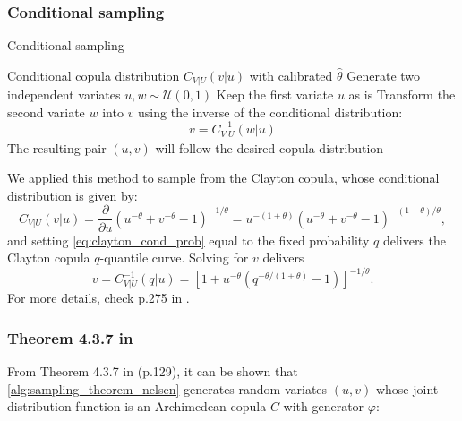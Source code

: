 \subsubsection{Conditional sampling}

\begin{algorithm}[H]
\caption{Conditional sampling}
\begin{algorithmic}[1]
\Require Conditional copula distribution $C_{V|U}(v|u)$ with calibrated $\hat \theta$
\State Generate two independent variates $u,w\sim \mathcal U(0,1)$
\State Keep the first variate $u$ as is
\State Transform the second variate $w$ into $v$ using the inverse of the conditional distribution:
$$v = C^{-1}_{V|U}(w|u)$$
\Ensure The resulting pair $(u,v)$ will follow the desired copula distribution
\end{algorithmic}
\end{algorithm}

We applied this method to sample from the Clayton copula, whose conditional distribution is given by:
\begin{equation}\label{eq:clayton_cond_prob}
	C_{V|U}(v|u)= \frac{\partial}{\partial u} (u^{-\theta}+v^{-\theta} - 1)^{-1/\theta} = u^{-(1+\theta)}(u^{-\theta}+v^{-\theta} - 1)^{-(1+\theta)/\theta},
\end{equation}
and setting \eqref{eq:clayton_cond_prob} equal to the fixed probability $q$ delivers the Clayton copula $q$-quantile curve. Solving for $v$ delivers%
$$v = C_{V|U}^{-1} (q|u)= \left[1+u^{-\theta}(q^{-\theta/(1+\theta)} - 1)\right]^{-1/\theta}.$$
For more details, check p.275 in \cite{alexander2008market}.



\subsubsection{Theorem 4.3.7 in \cite{Nelsen2006}}
From Theorem 4.3.7 in \cite{Nelsen2006} (p.129), it can be shown that \cref{alg:sampling_theorem_nelsen} generates random variates $(u,v)$ whose joint distribution function is an Archimedean copula $C$ with generator $\varphi$: %


